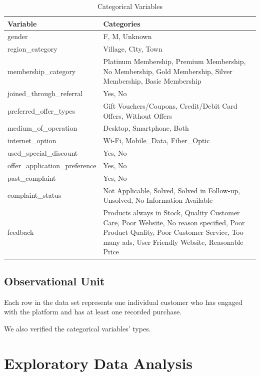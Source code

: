 \documentclass[
  letterpaper,
  DIV=11,
  numbers=noendperiod]{scrartcl}
\begin{document}
\begin{table}[!h]

\caption{Categorical Variables}
\centering
\fontsize{10}{12}\selectfont
\begin{tabular}[t]{l>{\raggedright\arraybackslash}p{12cm}}
\toprule
Variable & Categories\\
\midrule
gender & F, M, Unknown\\
region\_category & Village, City, Town\\
membership\_category & Platinum Membership, Premium Membership, No Membership, Gold Membership, Silver Membership, Basic Membership\\
joined\_through\_referral & Yes, No\\
preferred\_offer\_types & Gift Vouchers/Coupons, Credit/Debit Card Offers, Without Offers\\
medium\_of\_operation & Desktop, Smartphone, Both\\
internet\_option & Wi-Fi, Mobile\_Data, Fiber\_Optic\\
used\_special\_discount & Yes, No\\
offer\_application\_preference & Yes, No\\
past\_complaint & Yes, No\\
complaint\_status & Not Applicable, Solved, Solved in Follow-up, Unsolved, No Information Available\\
feedback & Products always in Stock, Quality Customer Care, Poor Website, No reason specified, Poor Product Quality, Poor Customer Service, Too many ads, User Friendly Website, Reasonable Price\\
\bottomrule
\end{tabular}
\end{table}

\subsection{Observational Unit}\label{observational-unit}

Each row in the data set represents one individual customer who has
engaged with the platform and has at least one recorded purchase.

We also verified the categorical variables' types.

\section{Exploratory Data Analysis}\label{exploratory-data-analysis}
\end{document}
